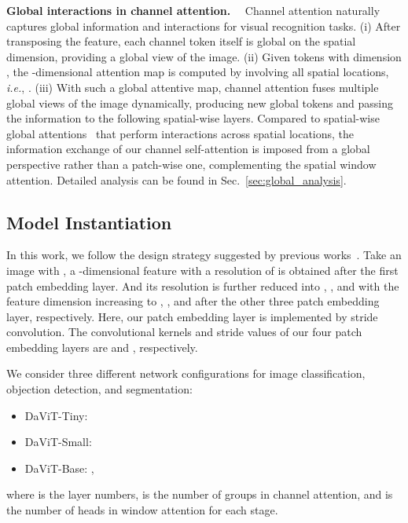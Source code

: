 \documentclass[runningheads]{llncs}
\newcommand{\ie}{\emph{i.e.}}
\newcommand{\modelInTable}{DaViT\xspace}
\begin{document}
\noindent \textbf{Global interactions in channel attention.}~~
Channel attention naturally captures global information and interactions for visual recognition tasks.
(i) After transposing the feature, each channel token itself is global on the spatial dimension, providing a global view of the image.
(ii) Given  tokens with dimension , the -dimensional attention map is computed by involving all spatial locations, \ie, .
(iii) With such a global attentive map, channel attention fuses multiple global views of the image dynamically, producing new global tokens and passing the information to the following spatial-wise layers.
Compared to spatial-wise global attentions~\cite{touvron2021training,dosovitskiy2020image} that perform interactions across spatial locations, the information exchange of our channel self-attention is imposed from a global perspective rather than a patch-wise one, complementing the spatial window attention. Detailed analysis can be found in Sec.~\ref{sec:global_analysis}.



\subsection{Model Instantiation}
\label{sec:model_config}
In this work, we follow the design strategy suggested by previous works~\cite{liu2021swin,yang2021focal}.
Take an image with , a -dimensional feature with a resolution of  is obtained after the first patch embedding layer. And its resolution is further reduced into , , and  with the feature dimension increasing to , , and  after the other three patch embedding layer, respectively.
Here, our patch embedding layer is implemented by stride convolution. The convolutional kernels and stride values of our four patch embedding layers are  and , respectively. 


We consider three different network configurations for image classification, objection detection, and segmentation:
\begin{itemize}
\footnotesize
\vspace{-4pt}
    \item \modelInTable-Tiny: 
    \item \modelInTable-Small: 
    \item \modelInTable-Base: ,
\vspace{-4pt}
\end{itemize} where  is the layer numbers,  is the number of groups in channel attention, and  is the number of heads in window attention for each stage.
\end{document}
